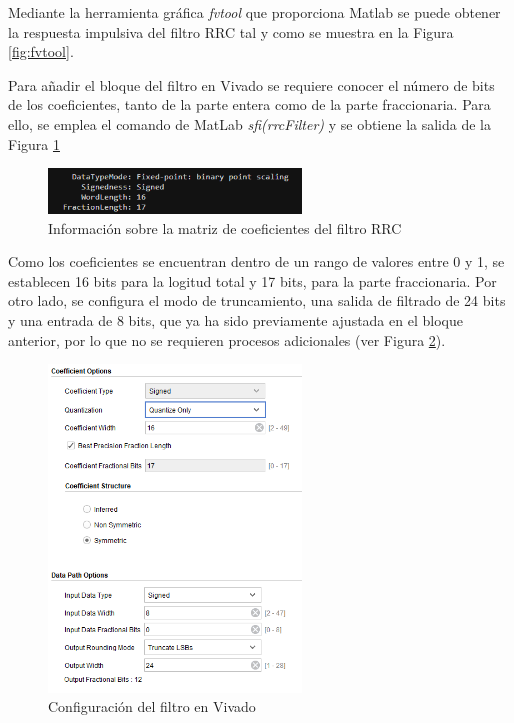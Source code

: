 \vspace{3mm}

Mediante la herramienta gráfica \textit{fvtool} que proporciona Matlab se puede obtener la respuesta impulsiva del filtro RRC tal y como se muestra en la Figura \ref{fig:fvtool}.

Para añadir el bloque del filtro en Vivado se requiere conocer el número de bits de los coeficientes, tanto de la parte entera como de la parte fraccionaria. Para ello, se emplea el comando de MatLab \textit{sfi(rrcFilter)} y se obtiene la salida de la Figura \ref{fig:fvtool2}

\vspace{3mm}

\begin{figure}[h]
	\centering
	\includegraphics[width=0.6\textwidth]{img/matlab/coefs.PNG}
	\caption{Información sobre la matriz de coeficientes del filtro RRC}
	\label{fig:fvtool2}
\end{figure}
    
\vspace{3mm}

Como los coeficientes se encuentran dentro de un rango de valores entre 0 y 1, se establecen 16 bits para la logitud total y 17 bits, para la parte fraccionaria. Por otro lado, se configura el modo de truncamiento, una salida de filtrado de 24 bits y una entrada de 8 bits, que ya ha sido previamente ajustada en el bloque anterior, por lo que no se requieren procesos adicionales (ver Figura \ref{fig:fvtool3}).

\vspace{3mm}

\begin{figure}[h]
	\centering
	\includegraphics[width=0.6\textwidth]{img/diseno/fir.PNG}
	\caption{Configuración del filtro en Vivado}
	\label{fig:fvtool3}
\end{figure}
    
